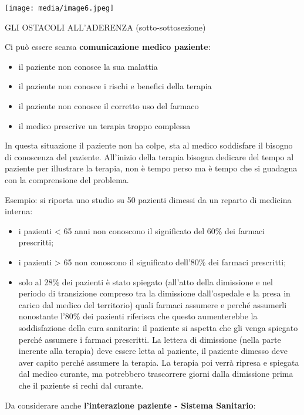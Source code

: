 \documentclass[]{article}
\begin{document}
\texttt{[image: media/image6.jpeg]}

GLI OSTACOLI ALL'ADERENZA (sotto-sottosezione)

Ci può essere scarsa \textbf{comunicazione medico paziente}:

\begin{itemize}
\item
  il paziente non conosce la sua malattia
\item
  il paziente non conosce i rischi e benefici della terapia
\item
  il paziente non conosce il corretto uso del farmaco
\item
  il medico prescrive un terapia troppo complessa
\end{itemize}

In questa situazione il paziente non ha colpe, sta al medico soddisfare
il bisogno di conoscenza del paziente. All'inizio della terapia bisogna
dedicare del tempo al paziente per illustrare la terapia, non è tempo
perso ma è tempo che si guadagna con la comprensione del problema.

Esempio: si riporta uno studio su 50 pazienti dimessi da un reparto di
medicina interna:

\begin{itemize}
\item
  i pazienti \textless{} 65 anni non conoscono il significato del 60\%
  dei farmaci prescritti;
\item
  i pazienti \textgreater{} 65 non conoscono il significato dell'80\%
  dei farmaci prescritti;
\item
  solo al 28\% dei pazienti è stato spiegato (all'atto della dimissione
  e nel periodo di transizione compreso tra la dimissione dall'ospedale
  e la presa in carico dal medico del territorio) quali farmaci assumere
  e perché assumerli nonostante l'80\% dei pazienti riferisca che questo
  aumenterebbe la soddisfazione della cura sanitaria: il paziente si
  aspetta che gli venga spiegato perché assumere i farmaci prescritti.
  La lettera di dimissione (nella parte inerente alla terapia) deve
  essere letta al paziente, il paziente dimesso deve aver capito perché
  assumere la terapia. La terapia poi verrà ripresa e spiegata dal
  medico curante, ma potrebbero trascorrere giorni dalla dimissione
  prima che il paziente si rechi dal curante.
\end{itemize}

Da considerare anche \textbf{l'interazione paziente - Sistema
Sanitario}:
\end{document}
